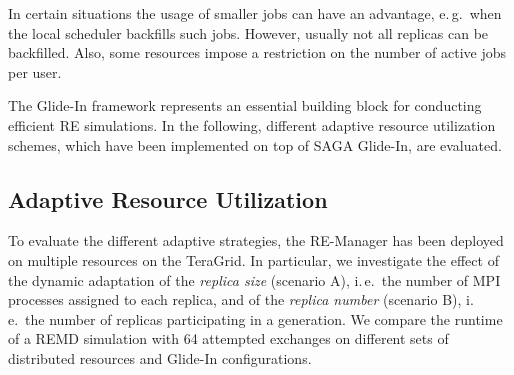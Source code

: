 \documentclass{rspublic}
\begin{document}
In certain situations the usage of smaller jobs can have an advantage,
e.\,g.\ when the local scheduler backfills such jobs. However, usually
not all replicas can be backfilled. Also, some resources
impose a restriction on the number of active jobs per user. 


The Glide-In framework represents an essential building block for
conducting efficient RE simulations. In the following,
different adaptive resource utilization schemes, which have been
implemented on top of SAGA Glide-In, are evaluated.

\subsection{Adaptive Resource Utilization}

To evaluate the different adaptive strategies, the RE-Manager
has been deployed on multiple resources  on the
TeraGrid. In particular, we investigate the effect of 
the dynamic adaptation of the \emph{replica size} (scenario A), i.\,e.\ 
the number of MPI processes assigned to each replica,  
and of the \emph{replica number} (scenario B), i.\,e.\
the number of replicas participating in a generation.  
We compare the runtime of a REMD simulation with 64 attempted 
exchanges on different sets of distributed resources and Glide-In 
configurations.  
                    
\end{document}
